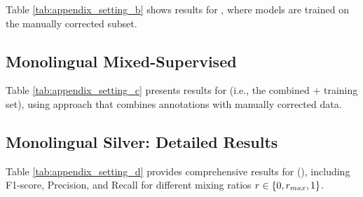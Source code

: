 Table \ref{tab:appendix_setting_b} shows results for \Sval, where models are trained on the manually corrected subset.

\begin{table}[h]
    \centering
    \small
    \resizebox{1\textwidth}{!}{
        
    }
    \caption{F1-scores for \Sval by language and model.}
    \label{tab:appendix_setting_b}
\end{table}

\clearpage

\subsection{Monolingual Mixed-Supervised}
\label{appendix:setting_c}

Table \ref{tab:appendix_setting_c} presents results for \Sstar (i.e., the combined \Ssilver + \Sval training set), using \hybridmodel approach that combines \Ssilver annotations with manually corrected \Sval data.

\begin{table}[h]
    \centering
    \small
    \resizebox{1\textwidth}{!}{
        
    }
    \caption{F1-scores for \Sstar by language and model, comparing \distilmodels ($\rmix=1$) and \weakModel ($\rmix=0$).}
    \label{tab:appendix_setting_c}
\end{table}

\clearpage

\subsection{Monolingual Silver: Detailed Results}
\label{appendix:setting_d}

Table \ref{tab:appendix_setting_d} provides comprehensive results for \Ssilver (\mono), including F1-score, Precision, and Recall for different mixing ratios $r \in \{0, r_{max}, 1\}$.

\begin{landscape}
\begin{table}[p]
    \centering
    \small
    \resizebox{1.5\textwidth}{!}{
    
    }
    \caption{Detailed results for \Ssilver by language and model. Shows performance at $\rmix=1$ (\distilmodels only), $\rmix=0$ (\weakModel only), and optimal ratio $\rmix_{max}$ (\hybridmodel).}
    \label{tab:appendix_setting_d}
\end{table}
\end{landscape}
\clearpage

